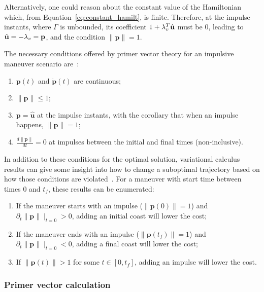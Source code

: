 Alternatively, one could reason about the constant value of the Hamiltonian which, from Equation~\eqref{eq:constant_hamilt}, is finite. Therefore, at the impulse instants, where \(\Gamma\) is unbounded, its coefficient \(1 + \lambda_v^T \hat{\mathbf{u}}\) must be \(0\), leading to \(\hat{\mathbf{u}} = -\lambda_v = \mathbf{p}\), and the condition \(\lVert \mathbf{p} \rVert = 1\).

The necessary conditions offered by primer vector theory for an impulsive maneuver scenario are~\cite{Conway_2010}:
\begin{enumerate}
    \item \(\mathbf{p}(t)\) and \(\dot{\mathbf{p}}(t)\) are continuous;
    \item \(\lVert \mathbf{p} \rVert \leq 1\);
    \item \(\mathbf{p} = \hat{\mathbf{u}}\) at the impulse instants, with the corollary that when an impulse happens, \(\lVert \mathbf{p} \rVert = 1\);
    \item \(\frac{d \lVert \mathbf{p} \rVert}{dt} = 0\) at impulses between the initial and final times (non-inclusive).
\end{enumerate}

In addition to these conditions for the optimal solution, variational calculus results can give some insight into how to change a suboptimal trajectory based on how those conditions are violated~\cite{Conway_2010}. For a maneuver with start time between times \(0\) and \(t_f\), these results can be enumerated:
\begin{enumerate}
    \item If the maneuver starts with an impulse (\(\lVert \mathbf{p}(0) \rVert = 1\)) and \(\partial_t \lVert \mathbf{p} \rVert \mid_{t=0} > 0\), adding an initial coast will lower the cost;
    \item If the maneuver ends with an impulse (\(\lVert \mathbf{p}(t_f) \rVert = 1\)) and \(\partial_t \lVert \mathbf{p} \rVert \mid_{t=0} < 0\), adding a final coast will lower the cost;
    \item If \(\lVert \mathbf{p}(t) \rVert > 1\) for some \(t \in [0, t_f]\), adding an impulse will lower the cost.
\end{enumerate}

\subsubsection{Primer vector calculation}\label{sssec:pv_calc_cons}


